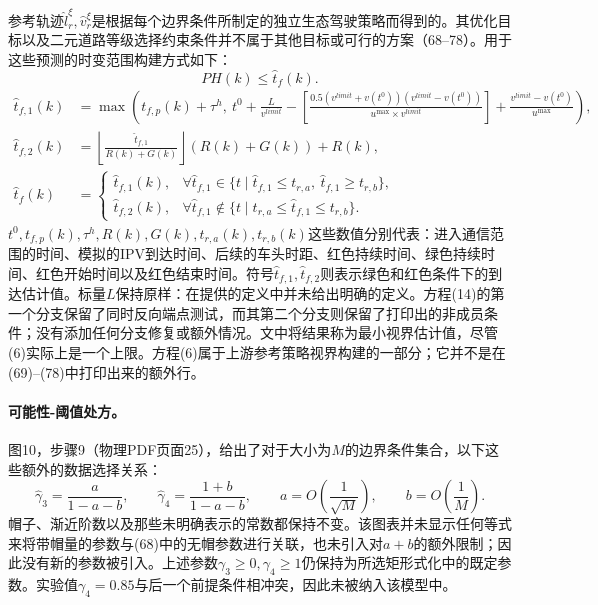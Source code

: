 \documentclass[10pt]{article}
\begin{document}
参考轨迹\(\hat l_r^\xi,\hat v_r^\xi\)是根据每个边界条件所制定的独立生态驾驶策略而得到的。其优化目标以及二元道路等级选择约束条件并不属于其他目标或可行的方案（68–78）。用于这些预测的时变范围构建方式如下：
\begin{equation}
PH(k)\leq\hat t_f(k).
\tag{6}
\end{equation}
\begin{equation}
\begin{aligned}
\hat t_{f,1}(k)&=\max\left(t_{f,p}(k)+\tau^h,\ t^0+\frac{L}{v^{limit}}
-\left[\frac{0.5(v^{limit}+v(t^0))(v^{limit}-v(t^0))}{u^{\max}\times v^{limit}}\right]
+\frac{v^{limit}-v(t^0)}{u^{\max}}\right),\\
\hat t_{f,2}(k)&=\left\lfloor\frac{\hat t_{f,1}}{R(k)+G(k)}\right\rfloor(R(k)+G(k))+R(k),\\
\hat t_f(k)&=\begin{cases}
\hat t_{f,1}(k),&\forall\hat t_{f,1}\in\{t\mid\hat t_{f,1}\leq t_{r,a},\ \hat t_{f,1}\geq t_{r,b}\},\\
\hat t_{f,2}(k),&\forall\hat t_{f,1}\notin\{t\mid t_{r,a}\leq\hat t_{f,1}\leq t_{r,b}\}.
\end{cases}
\end{aligned}
\tag{14}
\end{equation}
\(t^0,t_{f,p}(k),\tau^h,R(k),G(k),t_{r,a}(k),t_{r,b}(k)\)这些数值分别代表：进入通信范围的时间、模拟的IPV到达时间、后续的车头时距、红色持续时间、绿色持续时间、红色开始时间以及红色结束时间。符号\(\hat t_{f,1},\hat t_{f,2}\)则表示绿色和红色条件下的到达估计值。标量\(L\)保持原样：在提供的定义中并未给出明确的定义。方程(14)的第一个分支保留了同时反向端点测试，而其第二个分支则保留了打印出的非成员条件；没有添加任何分支修复或额外情况。文中将结果称为最小视界估计值，尽管(6)实际上是一个上限。方程(6)属于上游参考策略视界构建的一部分；它并不是在(69)--(78)中打印出来的额外行。

\paragraph{可能性-阈值处方。}
图10，步骤9（物理PDF页面25），给出了对于大小为\(M\)的边界条件集合，以下这些额外的数据选择关系：
\[
\hat\gamma_3=\frac{a}{1-a-b},\qquad
\hat\gamma_4=\frac{1+b}{1-a-b},\qquad
 a=O\!\left(\frac1{\sqrt M}\right),\qquad b=O\!\left(\frac1M\right).
\]
帽子、渐近阶数以及那些未明确表示的常数都保持不变。该图表并未显示任何等式来将带帽量的参数与(68)中的无帽参数进行关联，也未引入对\(a+b\)的额外限制；因此没有新的参数被引入。上述参数\(\gamma_3\geq0,\gamma_4\geq1\)仍保持为所选矩形式化中的既定参数。实验值\(\gamma_4=0.85\)与后一个前提条件相冲突，因此未被纳入该模型中。
\end{document}
